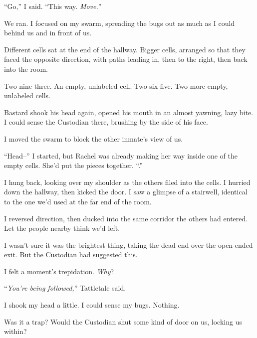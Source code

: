 ``Go,'' I said.  ``This way.  \emph{Move.}''



We ran.  I focused on my swarm, spreading the bugs out as much as I could behind us and in front of us.



Different cells sat at the end of the hallway.  Bigger cells, arranged so that they faced the opposite direction, with paths leading in, then to the right, then back into the room.



Two-nine-three.  An empty, unlabeled cell.  Two-six-five.  Two more empty, unlabeled cells.



Bastard shook his head again, opened his mouth in an almost yawning, lazy bite.  I could sense the Custodian there, brushing by the side of his face.



I moved the swarm to block the other inmate's view of us.



``Head--'' I started, but Rachel was already making her way inside one of the empty cells.  She'd put the pieces together.  ``\ldotsright.''



I hung back, looking over my shoulder as the others filed into the cells.  I hurried down the hallway, then kicked the door.  I saw a glimpse of a stairwell, identical to the one we'd used at the far end of the room.



I reversed direction, then ducked into the same corridor the others had entered.  Let the people nearby think we'd left.



I wasn't sure it was the brightest thing, taking the dead end over the open-ended exit.  But the Custodian had suggested this.



I felt a moment's trepidation.  \emph{Why}?



``\emph{You're being followed,}'' Tattletale said.



I shook my head a little.  I could sense my bugs.  Nothing.



Was it a trap?  Would the Custodian shut some kind of door on us, locking us within?




